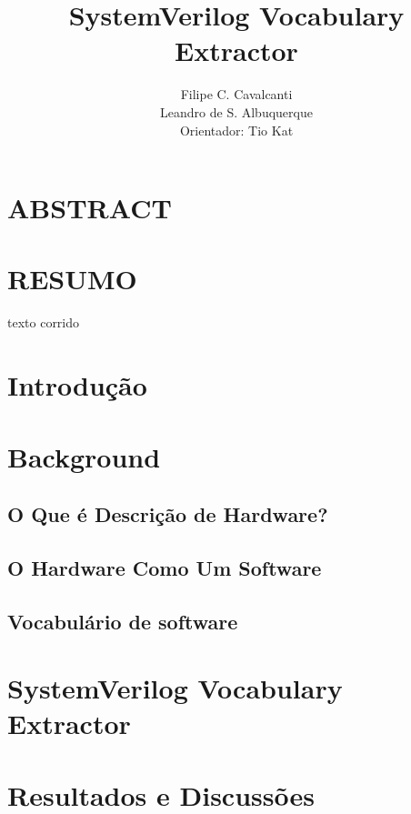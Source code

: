 \documentclass[12pt, twocolumn, a4paper]{article}
\begin{document}
	\title{SystemVerilog Vocabulary Extractor}
	\author{Filipe C. Cavalcanti\\ Leandro de S. Albuquerque\\
	Orientador: Tio Kat}
	\maketitle
	
	\section{ABSTRACT}
	
	\section{RESUMO}
	texto corrido\cite{Antoniol2007}
	\section{Introdução}
	\section{Background}
	\subsection{O Que é Descrição de Hardware?}
	\subsection{O Hardware Como Um Software}
	\subsection{Vocabulário de software}
	\section{SystemVerilog Vocabulary Extractor}
	\section{Resultados e Discussões}
	
\end{document}
